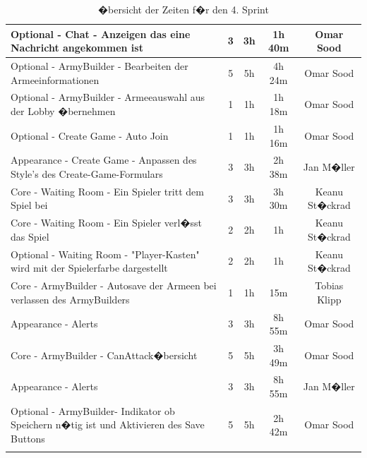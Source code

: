 \documentclass[12pt, titlepage]{scrartcl}
\begin{document}
\begin{center}
\begin{longtable}{p{6cm} c c c c }
					Optional - Chat - Anzeigen das eine Nachricht angekommen ist  & 3 & 3h & 1h 40m & Omar Sood\\ \hline
					
					Optional - ArmyBuilder - Bearbeiten der Armeeinformationen & 5 & 5h & 4h 24m & Omar Sood\\ \hline
					
					Optional - ArmyBuilder - Armeeauswahl aus der Lobby �bernehmen & 1 & 1h & 1h 18m & Omar Sood\\ \hline
					
					Optional - Create Game - Auto Join & 1 & 1h & 1h 16m & Omar Sood\\ \hline
					
					Appearance - Create Game - Anpassen des Style's des Create-Game-Formulars & 3 & 3h & 2h 38m & Jan M�ller\\ \hline
					
					Core - Waiting Room - Ein Spieler tritt dem Spiel bei & 3 & 3h & 3h 30m & Keanu St�ckrad\\ \hline
					
					Core - Waiting Room - Ein Spieler verl�sst das Spiel & 2 & 2h & 1h & Keanu St�ckrad \\ \hline
					
					Optional - Waiting Room - "Player-Kasten" wird mit der Spielerfarbe dargestellt & 2 & 2h & 1h & Keanu St�ckrad\\ \hline
					
					Core - ArmyBuilder - Autosave der Armeen bei verlassen des ArmyBuilders & 1 & 1h & 15m & Tobias Klipp\\
					
					Appearance - Alerts & 3 & 3h & 8h 55m & Omar Sood \\ \hline
					
					Core - ArmyBuilder - \glqq CanAttack\grqq �bersicht & 5 & 5h & 3h 49m & Omar Sood \\ \hline
					
					Appearance - Alerts & 3 & 3h & 8h 55m & Jan M�ller \\ \hline
					
					Optional - ArmyBuilder- Indikator ob Speichern n�tig ist und Aktivieren des Save Buttons & 5 & 5h & 2h 42m & Omar Sood\\
					\caption{�bersicht der Zeiten f�r den 4. Sprint} \\
				\end{longtable}
			\end{center}
			
\end{document}
